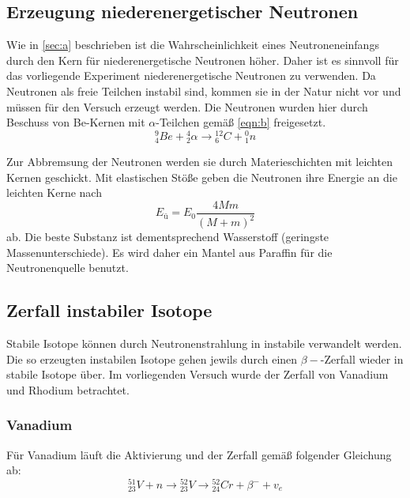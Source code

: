 \subsection{Erzeugung niederenergetischer Neutronen}
\label{sec:erzeugung}
Wie in \autoref{sec:a} beschrieben ist die Wahrscheinlichkeit eines Neutroneneinfangs durch den Kern für niederenergetische Neutronen höher. Daher ist es sinnvoll für das vorliegende Experiment niederenergetische Neutronen zu verwenden. Da Neutronen als freie Teilchen instabil sind, kommen sie in der Natur nicht vor und müssen für den Versuch erzeugt werden. Die Neutronen wurden hier durch Beschuss von Be-Kernen mit $\alpha$-Teilchen gemäß \autoref{eqn:b} freigesetzt.
\begin{equation}
    \label{eqn:b}
    {^{9}_{4}Be} + {^{4}_{2}\alpha} \rightarrow {^{12}_{6}C}+{^{0}_{1}n}
\end{equation}

Zur Abbremsung der Neutronen werden sie durch Materieschichten mit leichten Kernen geschickt. Mit elastischen Stöße geben die Neutronen ihre Energie an
die leichten Kerne nach  
\begin{equation}
	E_\text{ü} = E_0 \frac{4Mm}{(M+m)^2}
		\label{eqn:e}
\end{equation}
ab. Die beste Substanz ist dementsprechend Wasserstoff (geringste Massenunterschiede). Es wird daher ein Mantel aus Paraffin für die Neutronenquelle benutzt.

\subsection{Zerfall instabiler Isotope}
\label{sec:zerfall}
Stabile Isotope können durch Neutronenstrahlung in instabile verwandelt werden. Die so erzeugten instabilen Isotope
gehen jewils durch einen $β-$-Zerfall wieder in stabile Isotope über. Im vorliegenden Versuch wurde der Zerfall von Vanadium und Rhodium betrachtet. 
\subsubsection*{Vanadium}
Für Vanadium läuft die Aktivierung und der Zerfall gemäß folgender Gleichung ab:
\begin{equation}
    \label{eqn:v}
    {^{51}_{23}V} + n \rightarrow {^{52}_{23}V} \rightarrow {^{52}_{24}Cr} + \beta^- +v_e
\end{equation}

